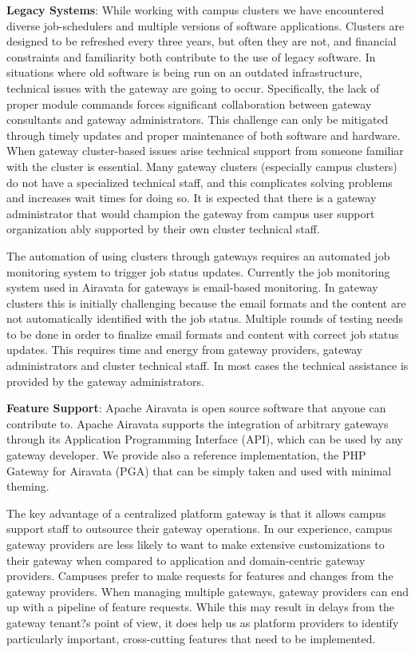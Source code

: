 \documentclass[sigconf]{acmart}
\begin{document}
\noindent\textbf{Legacy Systems}: While working with campus clusters we have encountered diverse job-schedulers and multiple versions of software applications. Clusters are designed to be refreshed every three years, but often they are not, and financial constraints and familiarity both contribute to the use of legacy software. In situations where old software is being run on an outdated infrastructure, technical issues with the gateway are going to occur.  Specifically, the lack of proper module commands forces significant collaboration between gateway consultants and gateway administrators. This challenge can only be mitigated through timely updates and proper maintenance of both software and hardware.  When gateway cluster-based issues arise  technical support from someone familiar with the cluster is essential. Many gateway clusters (especially campus clusters) do not have a specialized technical staff, and this complicates solving problems and increases wait times for doing so. It is expected that there is a gateway administrator that would champion the gateway from campus user support organization ably supported by their own cluster technical staff.

The automation of using clusters through gateways requires an automated job monitoring system to trigger job status updates. Currently the job monitoring system used in Airavata for gateways is email-based monitoring. In gateway clusters this is initially challenging because the email formats and the content are not automatically identified with  the job status. Multiple rounds of testing needs to be done in order to finalize email formats and content with correct job status updates. This requires time and energy from gateway providers, gateway administrators and cluster technical staff. In most cases the technical assistance is provided by the gateway administrators.

\noindent\textbf{Feature Support}: Apache Airavata is open source software that anyone can contribute to. Apache Airavata supports the integration of arbitrary gateways through its Application Programming Interface (API), which can be used by any gateway developer. We provide also a reference implementation, the PHP Gateway for Airavata (PGA) that can be simply taken and used with minimal theming.

The key advantage of a centralized platform gateway is that it allows campus support staff to outsource their gateway operations. In our experience, campus gateway providers are less likely to want to make extensive customizations to their gateway when compared to application and domain-centric gateway providers. Campuses prefer to make requests for features and changes from the gateway providers.  When managing multiple gateways, gateway providers can end up with a pipeline of feature requests.  While this may result in delays from the gateway tenant?s point of view, it does help us as platform providers to identify particularly important, cross-cutting features that need to be implemented.
\end{document}

